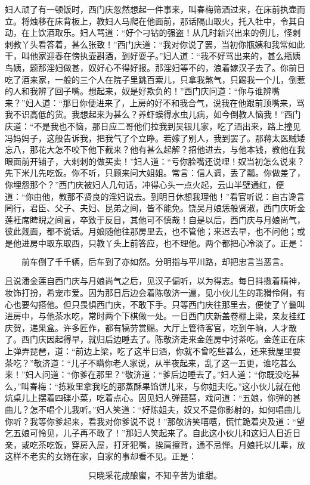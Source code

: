 妇人顽了有一顿饭时，西门庆忽然想起一件事来，叫春梅筛酒过来，在床前执壶而立。将烛移在床背板上，教妇人马爬在他面前，那话隔山取火，托入牡中，令其自动，在上饮酒取乐。妇人骂道：“好个刁钻的强盗！从几时新兴出来的例儿，怪剌剌教丫头看答着，甚么张致！”西门庆道：“我对你说了罢，当初你瓶姨和我常如此干，叫他家迎春在傍执壶斟酒，到好耍子。”妇人道：“我不好骂出来的，甚么瓶姨鸟姨，题那淫妇做甚，奴好心不得好报。那淫妇等不的，浪着嫁汉子去了。你前日吃了酒来家，一般的三个人在院子里跳百索儿，只拿我煞气，只踢我一个儿，倒惹的人和我辨了回子嘴。想起来，奴是好欺负的！”西门庆问道：“你与谁辨嘴来？”妇人道：“那日你便进来了，上房的好不和我合气，说我在他跟前顶嘴来，骂我不识高低的货。我想起来为甚么？养虾蟆得水虫儿病，如今倒教人恼我！”西门庆道：“不是我也不恼，那日应二哥他们拉我到吴银儿家，吃了酒出来，路上撞见冯妈妈子，这般告诉我，把我气了个立睁。若嫁了别人，我到罢了。那蒋太医贼矮忘八，那花大怎不咬下他下截来？他有甚么起解？招他进去，与他本钱，教他在我眼面前开铺子，大剌剌的做买卖！”妇人道：“亏你脸嘴还说哩！奴当初怎么说来？先下米儿先吃饭。你不听，只顾来问大姐姐。常言：信人调，丢了瓢。你做差了，你埋怨那个？”西门庆被妇人几句话，冲得心头一点火起，云山半壁通红，便道：“你由他，教那不贤良的淫妇说去。到明日休想我理他！”看官听说：自古谗言罔行，君臣、父子、夫妇、昆弟之间，皆不能免。饶吴月娘恁般贤淑，西门庆听金莲衽席睥睨之间言，卒致于反目，其他可不慎哉！自是以后，西门庆与月娘尚气，彼此觌面，都不说话。月娘随他往那房里去，也不管他；来迟去早，也不问他；或是他进房中取东取西，只教丫头上前答应，也不理他。两个都把心冷淡了。正是：

\[
前车倒了千千辆，后车到了亦如然。
分明指与平川路，却把忠言当恶言。
\]

且说潘金莲自西门庆与月娘尚气之后，见汉子偏听，以为得志。每日抖擞着精神，妆饰打扮，希宠市爱。因为那日后边会着陈敬济一遍，见小伙儿生的乖猾伶俐，有心也要勾搭他。但只畏惧西门庆，不敢下手。只等西门庆往那里去，便使了丫鬟叫进房中，与他茶水吃，常时两个下棋做一处。一日西门庆新盖卷棚上梁，亲友挂红庆贺，递果盒。许多匠作，都有犒劳赏赐。大厅上管待客官，吃到午晌，人才散了。西门庆因起得早，就归后边睡去了。陈敬济走来金莲房中讨茶吃。金莲正在床上弹弄琵琶，道：“前边上梁，吃了这半日酒，你就不曾吃些甚么，还来我屋里要茶吃？”敬济道：“儿子不瞒你老人家说，从半夜起来，乱了这一五更，谁吃甚么来！”妇人问道：“你爹在那里？”敬济道：“爹后边睡去了。”妇人道：“你既没吃甚么，”叫春梅：“拣籹里拿我吃的那蒸酥果馅饼儿来，与你姐夫吃。”这小伙儿就在他炕桌儿上摆着四碟小菜，吃着点心。因见妇人弹琵琶，戏问道：“五娘，你弹的甚曲儿？怎不唱个儿我听。”妇人笑道：“好陈姐夫，奴又不是你影射的，如何唱曲儿你听？我等你爹起来，看我对你爹说不说！”那敬济笑嘻嘻，慌忙跪着央及道：“望乞五娘可怜见，儿子再不敢了！”那妇人笑起来了。自此这小伙儿和这妇人日近日亲，或吃茶吃饭，穿房入屋，打牙犯嘴，挨肩擦背，通不忌惮。月娘托以儿辈，放这样不老实的女婿在家，自家的事却看不见。正是：

\[
只晓采花成酿蜜，不知辛苦为谁甜。
\]
